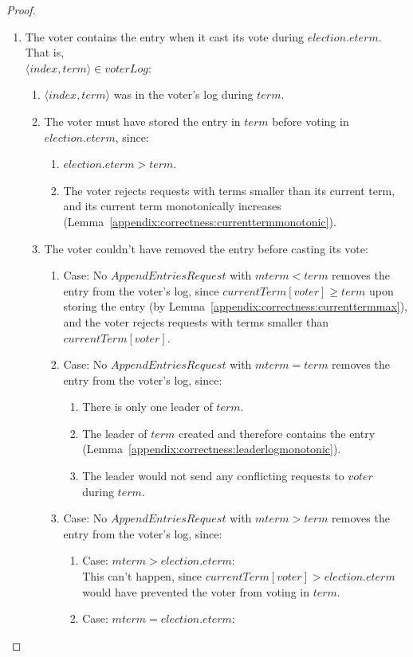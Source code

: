 \begin{proof}
\begin{enumerate}
\item The voter contains the entry when it cast its vote during
$election.eterm$. That is, \\ $\langle index, term \rangle \in voterLog$:

\begin{enumerate}
\item $\langle index, term \rangle$ was in the voter's log during
$term$.
\item The voter must have stored the entry in $term$ before voting in
$election.eterm$, since:
\begin{enumerate}
\item $election.eterm > term$.
\item The voter rejects requests with terms smaller than its current
term, and its current term monotonically increases
(Lemma~\ref{appendix:correctness:currenttermmonotonic}).
\end{enumerate}
\item The voter couldn't have removed the entry before casting its
vote:
\begin{enumerate}
\item Case: No $AppendEntriesRequest$ with $mterm < term$ removes the entry from the
voter's log, since $currentTerm[voter] \geq term$ upon storing the
entry (by Lemma~\ref{appendix:correctness:currenttermmax}),
and the voter rejects requests with terms smaller than
\\
$currentTerm[voter]$.
\item Case: No $AppendEntriesRequest$ with $mterm = term$ removes the entry from the
voter's log, since:
\begin{enumerate}
\item There is only one leader of $term$.
\item The leader of $term$ created and therefore
contains the entry (Lemma~\ref{appendix:correctness:leaderlogmonotonic}).
\item The leader would not send any conflicting
requests to $voter$ during $term$.
\end{enumerate}
\item Case: No $AppendEntriesRequest$ with $mterm > term$ removes the entry from the
voter's log, since:
\begin{enumerate}
\item Case: $mterm > election.eterm$:\\
This can't happen, since
$currentTerm[voter] > election.eterm$ would have prevented the voter from
voting in $term$.
\item Case: $mterm = election.eterm$:\\

\end{enumerate}
\end{enumerate}
\end{enumerate}
\end{enumerate}
\end{proof}
